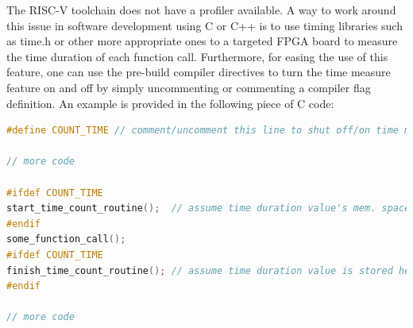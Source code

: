 The RISC-V toolchain does not have a profiler available. A way to work around this issue in software development using C or C++ is to use timing libraries such as time.h or other more appropriate ones to a targeted FPGA board to measure the time duration of each function call. Furthermore, for easing the use of this feature, one can use the pre-build compiler directives to turn the time measure feature on and off by simply uncommenting or commenting a compiler flag definition. An example is provided in the following piece of C code:
\begin{lstlisting}[frame=single,basicstyle=\footnotesize\ttfamily,linewidth=\columnwidth,breaklines=true,language=C]
#define COUNT_TIME // comment/uncomment this line to shut off/on time measure feature

// more code

#ifdef COUNT_TIME
start_time_count_routine();  // assume time duration value's mem. space is selected here
#endif
some_function_call();
#ifdef COUNT_TIME
finish_time_count_routine(); // assume time duration value is stored here 
#endif

// more code
\end{lstlisting}